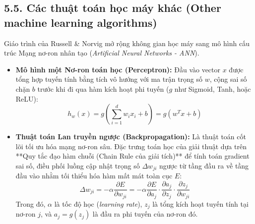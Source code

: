 \documentclass[../main.tex]{subfiles}
\begin{document}
\subsection{5.5. Các thuật toán học máy khác (Other machine learning algorithms)}
Giáo trình của Russell \& Norvig mở rộng không gian học máy sang mô hình cấu trúc Mạng nơ-ron nhân tạo (\textit{Artificial Neural Networks - ANN}).
\begin{itemize}
    \item \textbf{Mô hình một Nơ-ron toán học (Perceptron):} Đầu vào vector $x$ được tổng hợp tuyến tính bằng tích vô hướng với ma trận trọng số $w$, cộng sai số chặn $b$ trước khi đi qua hàm kích hoạt phi tuyến ($g$ như Sigmoid, Tanh, hoặc ReLU):
    \begin{equation}
        h_w(x) = g\left( \sum_{i=1}^{d} w_i x_i + b \right) = g(w^T x + b)
    \end{equation}
    \item \textbf{Thuật toán Lan truyền ngược (Backpropagation):} Là thuật toán cốt lõi tối ưu hóa mạng nơ-ron sâu. Đặc trưng toán học của giải thuật dựa trên **Quy tắc đạo hàm chuỗi (Chain Rule của giải tích)** để tính toán gradient sai số, điều phối luồng cập nhật trọng số $\Delta w_{ji}$ ngược từ tầng đầu ra về tầng đầu vào nhằm tối thiểu hóa hàm mất mát toàn cục $E$:
    \begin{equation}
        \Delta w_{ji} = -\alpha \frac{\partial E}{\partial w_{ji}} = -\alpha \frac{\partial E}{\partial a_j} \cdot \frac{\partial a_j}{\partial z_j} \cdot \frac{\partial z_j}{\partial w_{ji}}
    \end{equation}
    Trong đó, $\alpha$ là tốc độ học (\textit{learning rate}), $z_j$ là tổng kích hoạt tuyến tính tại nơ-ron $j$, và $a_j = g(z_j)$ là đầu ra phi tuyến của nơ-ron đó.
\end{itemize}
\end{document}
